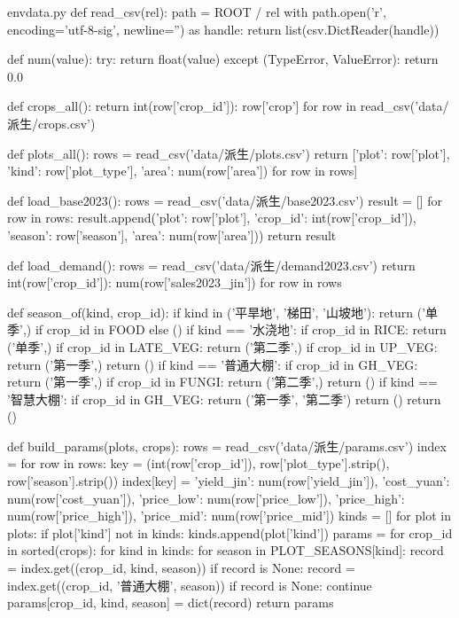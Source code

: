\documentclass[bwprint]{gmcmthesis}
\begin{document}
\begin{appendices}
\begin{Python}{envdata.py}
def read_csv(rel):
    path = ROOT / rel
    with path.open('r', encoding='utf-8-sig', newline='') as handle:
        return list(csv.DictReader(handle))

def num(value):
    try:
        return float(value)
    except (TypeError, ValueError):
        return 0.0

def crops_all():
    return {int(row['crop_id']): row['crop'] for row in read_csv('data/派生/crops.csv')}

def plots_all():
    rows = read_csv('data/派生/plots.csv')
    return [{'plot': row['plot'], 'kind': row['plot_type'], 'area': num(row['area'])} for row in rows]

def load_base2023():
    rows = read_csv('data/派生/base2023.csv')
    result = []
    for row in rows:
        result.append({'plot': row['plot'], 'crop_id': int(row['crop_id']), 'season': row['season'], 'area': num(row['area'])})
    return result

def load_demand():
    rows = read_csv('data/派生/demand2023.csv')
    return {int(row['crop_id']): num(row['sales2023_jin']) for row in rows}

def season_of(kind, crop_id):
    if kind in ('平旱地', '梯田', '山坡地'):
        return ('单季',) if crop_id in FOOD else ()
    if kind == '水浇地':
        if crop_id in RICE:
            return ('单季',)
        if crop_id in LATE_VEG:
            return ('第二季',)
        if crop_id in UP_VEG:
            return ('第一季',)
        return ()
    if kind == '普通大棚':
        if crop_id in GH_VEG:
            return ('第一季',)
        if crop_id in FUNGI:
            return ('第二季',)
        return ()
    if kind == '智慧大棚':
        if crop_id in GH_VEG:
            return ('第一季', '第二季')
        return ()
    return ()

def build_params(plots, crops):
    rows = read_csv('data/派生/params.csv')
    index = {}
    for row in rows:
        key = (int(row['crop_id']), row['plot_type'].strip(), row['season'].strip())
        index[key] = {'yield_jin': num(row['yield_jin']), 'cost_yuan': num(row['cost_yuan']), 'price_low': num(row['price_low']), 'price_high': num(row['price_high']), 'price_mid': num(row['price_mid'])}
    kinds = []
    for plot in plots:
        if plot['kind'] not in kinds:
            kinds.append(plot['kind'])
    params = {}
    for crop_id in sorted(crops):
        for kind in kinds:
            for season in PLOT_SEASONS[kind]:
                record = index.get((crop_id, kind, season))
                if record is None:
                    record = index.get((crop_id, '普通大棚', season))
                if record is None:
                    continue
                params[crop_id, kind, season] = dict(record)
    return params


\end{Python}
\end{appendices}
\end{document}
